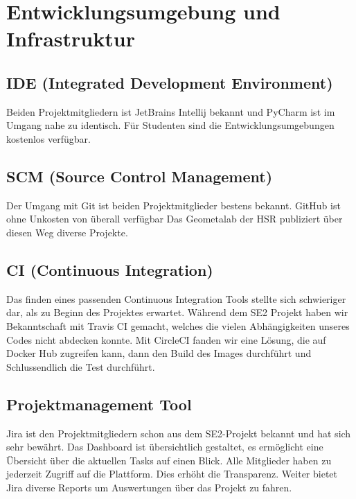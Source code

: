 \section{Entwicklungsumgebung und Infrastruktur}
\subsection{IDE (Integrated Development Environment)}
Beiden Projektmitgliedern ist JetBrains Intellij bekannt und \Gls{PyCharm} ist im Umgang nahe zu identisch.
Für Studenten sind die Entwicklungsumgebungen kostenlos verfügbar.
\subsection{SCM (Source Control Management)}
Der Umgang mit \Gls{Git} ist beiden Projektmitglieder bestens bekannt.
\Gls{GitHub} ist ohne Unkosten von überall verfügbar
Das Geometalab der HSR publiziert über diesen Weg diverse Projekte.

\subsection{CI (Continuous Integration)}
Das finden eines passenden Continuous Integration Tools stellte sich schwieriger dar, als zu Beginn des Projektes erwartet. Während dem SE2 Projekt haben wir Bekanntschaft mit Travis CI gemacht, welches die vielen Abhängigkeiten unseres Codes nicht abdecken konnte. Mit CircleCI fanden wir eine Lösung, die auf Docker Hub zugreifen kann, dann den Build des Images durchführt und Schlussendlich die Test durchführt.

\subsection{Projektmanagement Tool}
\Gls{Jira} ist den Projektmitgliedern schon aus dem SE2-Projekt bekannt und hat sich sehr bewährt.
Das Dashboard ist übersichtlich gestaltet, es ermöglicht eine Übersicht über die aktuellen Tasks auf einen Blick.
Alle Mitglieder haben zu jederzeit Zugriff auf die Plattform. Dies erhöht die Transparenz.
Weiter bietet Jira diverse Reports um Auswertungen über das Projekt zu fahren.
